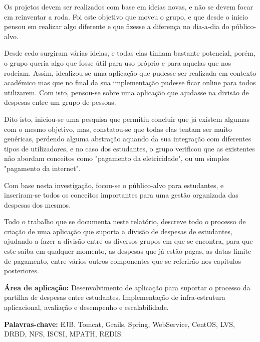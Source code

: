 \begin{resumo}

Os projetos devem ser realizados com base em ideias novas, e não se devem focar em reinventar a roda. Foi este objetivo que moveu o grupo, e que desde o inicio pensou em realizar algo diferente e que fizesse a diferença no dia-a-dia do público-alvo.

Desde cedo surgiram várias ideias, e todas elas tinham bastante potencial, porém, o grupo queria algo que fosse útil para uso próprio e para aquelas que nos rodeiam. Assim, idealizou-se uma aplicação que pudesse ser realizada em contexto académico mas que no final da sua implementação pudesse ficar online para todos utilizarem. Com isto, pensou-se sobre uma aplicação que ajudasse na divisão de despesas entre um grupo de pessoas.

Dito isto, iniciou-se uma pesquisa que permitiu concluir que já existem algumas com o mesmo objetivo, mas, constatou-se que todas elas tentam ser muito genéricas, perdendo alguma abstração aquando da sua integração com diferentes tipos de utilizadores, e no caso dos estudantes, o grupo verificou que as existentes não abordam conceitos como "pagamento da eletricidade", ou um simples "pagamento da internet".

Com base nesta investigação, focou-se o público-alvo para estudantes, e inseriram-se todos os conceitos importantes para uma gestão organizada das despesas dos mesmos.

Todo o trabalho que se documenta neste relatório, descreve todo o processo de criação de uma aplicação que suporta a divisão de despesas de estudantes, ajudando a fazer a divisão entre os diversos grupos em que se encontra, para que este saiba em qualquer momento, as despesas que já estão pagas, as datas limite de pagamento, entre vários outros componentes que se referirão nos capítulos posteriores.

\textbf{Área de aplicação:} Desenvolvimento de aplicação para suportar o processo da partilha de despesas entre estudantes. Implementação de infra-estrutura aplicacional, avaliação e desempenho e escalabilidade.

\textbf{Palavras-chave:} EJB, Tomcat, Grails, Spring, WebService, CentOS, LVS, DRBD, NFS, ISCSI, MPATH, REDIS.

\end{resumo}